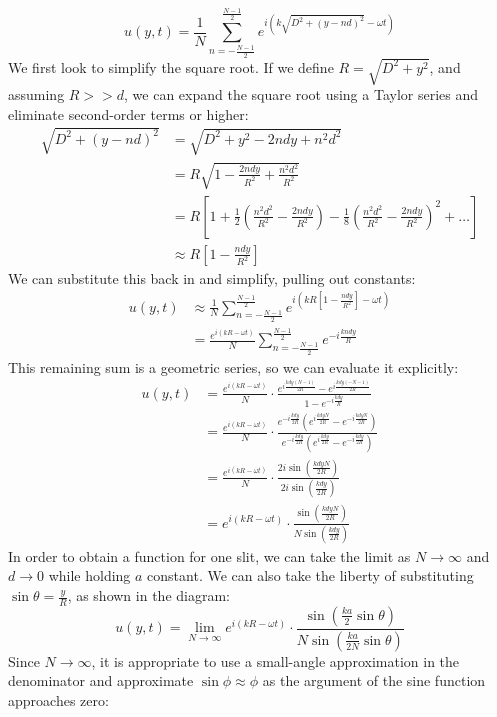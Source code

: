 \[
	u(y, t) = \frac{1}{N} \sum_{n = -\frac{N-1}{2}}^{\frac{N-1}{2}} e^{i(k \sqrt{D^2 + (y - nd)^2} - \omega t)}
\]
We first look to simplify the square root. If we define $R = \sqrt{D^2 + y^2}$, and assuming $R >> d$, we can expand the square root using a Taylor series and eliminate second-order terms or higher: 
\begin{align*}
\sqrt{D^2 + (y - nd)^2} &= \sqrt{D^2 + y^2 - 2ndy + n^2d^2}\\
&= R \sqrt{1 - \frac{2ndy}{R^2} + \frac{n^2d^2}{R^2}} \\
&= R \left[1 + \frac{1}{2}\left(\frac{n^2d^2}{R^2} - \frac{2ndy}{R^2} \right) - \frac{1}{8}\left(\frac{n^2d^2}{R^2} - \frac{2ndy}{R^2}  \right)^2 + \ldots \right]\\
&\approx R \left[1 - \frac{ndy}{R^2} \right]
\end{align*}
We can substitute this back in and simplify, pulling out constants: 
\begin{align*}
u(y, t) &\approx \frac{1}{N} \sum_{n = -\frac{N-1}{2}}^{\frac{N-1}{2}} e^{i(kR\left[1 - \frac{ndy}{R^2} \right] - \omega t)} \\
&= \frac{e^{i(kR-\omega t)}}{N} \sum_{n = -\frac{N-1}{2}}^{\frac{N-1}{2}} e^{-i  \frac{kndy}{R}}
\end{align*}
This remaining sum is a geometric series, so we can evaluate it explicitly: 
\begin{align*}
u(y, t) &= \frac{e^{i(kR-\omega t)}}{N} \cdot \frac{e^{i \frac{kdy(N-1)}{2R}} - e^{i\frac{kdy(-N-1)}{2R}}}{1 - e^{-i\frac{kdy}{R}}} \\
&= \frac{e^{i(kR-\omega t)}}{N} \cdot \frac{e^{-i\frac{kdy}{2R}} \left(e^{i \frac{kdyN}{2R}} - e^{-i\frac{kdyN}{2R}} \right)}{e^{-i\frac{kdy}{2R}} \left(e^{i\frac{kdy}{2R}} - e^{-i\frac{kdy}{2R}} \right)} \\
&= \frac{e^{i(kR-\omega t)}}{N} \cdot \frac{2i \sin \left(\frac{kdyN}{2R} \right)}{2i \sin\left(\frac{kdy}{2R}\right)} \\
&= e^{i(kR-\omega t)} \cdot \frac{ \sin \left(\frac{kdyN}{2R} \right)}{N \sin \left(\frac{kdy}{2R}\right)} 
\end{align*}
In order to obtain a function for one slit, we can take the limit as $N \to  \infty$ and $d \to 0$ while holding $a$ constant. We can also take the liberty of substituting $\sin \theta = \frac{y}{R}$, as shown in the diagram:
\[
u(y, t) = \lim_{N \to \infty} e^{i(kR-\omega t)} \cdot \frac{ \sin \left(\frac{ka}{2} \sin \theta \right)}{N \sin \left(\frac{ka}{2N} \sin \theta \right)}
\]
Since $N \to \infty$, it is appropriate to use a small-angle approximation in the denominator and approximate $\sin \phi \approx \phi$ as the argument of the sine function approaches zero:
